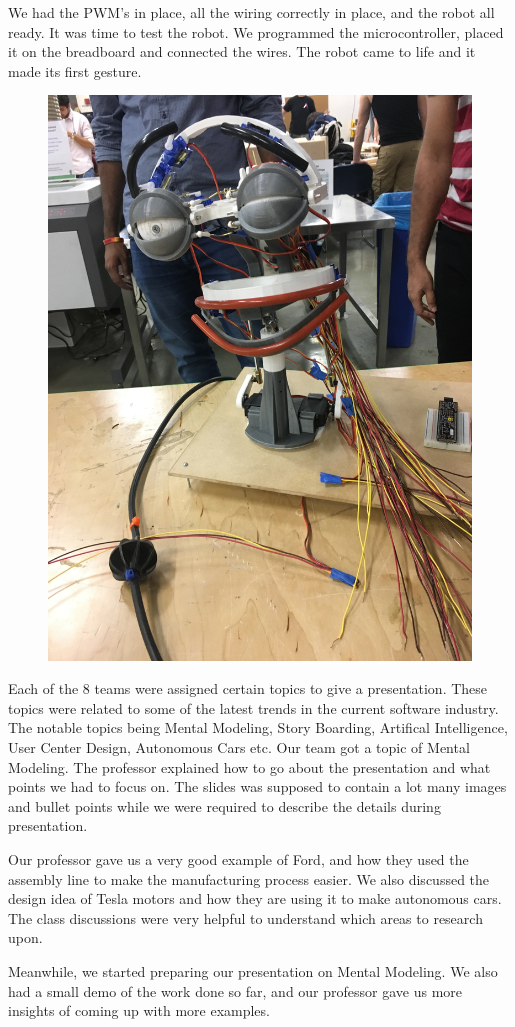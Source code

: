 \documentclass[index=totoc,hyperref,openany]{labbook} %
\begin{document}
We had the PWM's in place, all the wiring correctly in place, and the robot all ready. It was time to test the robot. We programmed the microcontroller, placed it on the breadboard and connected the wires. The robot came to life and it made its first gesture.

\begin{figure}[H]
\begin{center}
\includegraphics[width=0.4\linewidth, angle=-90]{the_first_movement}
\end{center}
\label{fig:the_first_movement}
\end{figure}


{\let\clearpage\relax {}}

Each of the 8 teams were assigned certain topics to give a presentation. These topics were related to some of the latest trends in the current software industry. The notable topics being Mental Modeling, Story Boarding, Artifical Intelligence, User Center Design, Autonomous Cars etc. Our team got a topic of Mental Modeling. The professor explained how to go about the presentation and what points we had to focus on. The slides was supposed to contain a lot many images and bullet points while we were required to describe the details during presentation.
\par Our professor gave us a very good example of Ford, and how they used the assembly line to make the manufacturing process easier. We also discussed the design idea of Tesla motors and how they are using it to make autonomous cars. The class discussions were very helpful to understand which areas to research upon.
\par Meanwhile, we started preparing our presentation on Mental Modeling. We also had a small demo of the work done so far, and our professor gave us more insights of coming up with more examples.
\end{document}
